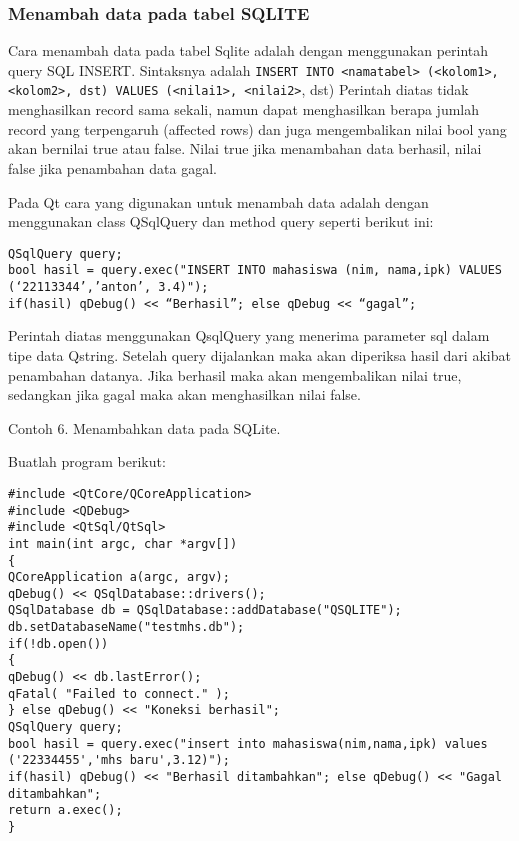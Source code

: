 \subsubsection{Menambah data pada tabel
SQLITE}\label{menambah-data-pada-tabel-sqlite}

Cara menambah data pada tabel Sqlite adalah dengan menggunakan perintah
query SQL INSERT. Sintaksnya adalah
\texttt{INSERT\ INTO\ \textless{}namatabel\textgreater{}\ (\textless{}kolom1\textgreater{},\textless{}kolom2\textgreater{},\ dst)\ VALUES\ (\textless{}nilai1\textgreater{},\ \textless{}nilai2\textgreater{}},
dst) Perintah diatas tidak menghasilkan record sama sekali, namun dapat
menghasilkan berapa jumlah record yang terpengaruh (affected rows) dan
juga mengembalikan nilai bool yang akan bernilai true atau false. Nilai
true jika menambahan data berhasil, nilai false jika penambahan data
gagal.

Pada Qt cara yang digunakan untuk menambah data adalah dengan
menggunakan class QSqlQuery dan method query seperti berikut ini:

\begin{verbatim}
QSqlQuery query;
bool hasil = query.exec("INSERT INTO mahasiswa (nim, nama,ipk) VALUES
(‘22113344’,’anton’, 3.4)");
if(hasil) qDebug() << “Berhasil”; else qDebug << “gagal”;
\end{verbatim}

Perintah diatas menggunakan QsqlQuery yang menerima parameter sql dalam
tipe data Qstring. Setelah query dijalankan maka akan diperiksa hasil
dari akibat penambahan datanya. Jika berhasil maka akan mengembalikan
nilai true, sedangkan jika gagal maka akan menghasilkan nilai false.

Contoh 6. Menambahkan data pada SQLite.

Buatlah program berikut:

\begin{verbatim}
#include <QtCore/QCoreApplication>
#include <QDebug>
#include <QtSql/QtSql>
int main(int argc, char *argv[])
{
QCoreApplication a(argc, argv);
qDebug() << QSqlDatabase::drivers();
QSqlDatabase db = QSqlDatabase::addDatabase("QSQLITE");
db.setDatabaseName("testmhs.db");
if(!db.open())
{
qDebug() << db.lastError();
qFatal( "Failed to connect." );
} else qDebug() << "Koneksi berhasil";
QSqlQuery query;
bool hasil = query.exec("insert into mahasiswa(nim,nama,ipk) values
('22334455','mhs baru',3.12)");
if(hasil) qDebug() << "Berhasil ditambahkan"; else qDebug() << "Gagal
ditambahkan";
return a.exec();
}
\end{verbatim}

